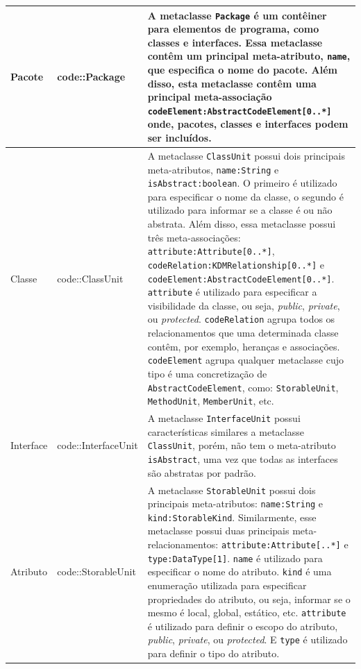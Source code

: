 \begin{longtable}[c]{| m{1.9cm} | m{3.57cm}| m{9.3cm} |}
 Pacote & code::Package & A metaclasse \texttt{Package} é um contêiner para elementos de programa, como classes e interfaces. Essa metaclasse contêm um principal meta-atributo, \texttt{name}, que especifica o nome do pacote. Além disso, esta metaclasse contêm uma principal meta-associação \texttt{codeElement:AbstractCodeElement[0..*]} onde, pacotes, classes e interfaces podem ser incluídos. \\ 
\hline
Classe & code::ClassUnit & A metaclasse \texttt{ClassUnit} possui dois principais meta-atributos,  \texttt{name:String} e \texttt{isAbstract:boolean}. O primeiro é utilizado para especificar o nome da classe, o segundo é utilizado para informar se a classe é ou não abstrata. Além disso, essa metaclasse possui três meta-associações: \texttt{attribute:Attribute[0..*]}, \texttt{codeRelation:KDMRelationship[0..*]} e  \texttt{codeElement:AbstractCodeElement[0..*]}. \texttt{attribute} é utilizado para especificar a  visibilidade da classe, ou seja, \textit{public}, \textit{private}, ou \textit{protected}. \texttt{codeRelation} agrupa todos os relacionamentos que uma determinada classe contêm, por exemplo, heranças e associações. \texttt{codeElement} agrupa qualquer metaclasse cujo tipo é uma concretização de \texttt{AbstractCodeElement}, como: \texttt{StorableUnit}, \texttt{MethodUnit}, \texttt{MemberUnit}, etc. \\ 
\hline
Interface & code::InterfaceUnit & A metaclasse \texttt{InterfaceUnit} possui características similares a metaclasse \texttt{ClassUnit}, porém, não tem o meta-atributo \texttt{isAbstract}, uma vez que todas as interfaces são abstratas por padrão. \\ 
\hline
Atributo & code::StorableUnit & A metaclasse \texttt{StorableUnit} possui dois principais meta-atributos: \texttt{name:String} e \texttt{kind:StorableKind}. Similarmente, esse metaclasse possui duas principais meta-relacionamentos: \texttt{attribute:Attribute[..*]} e \texttt{type:DataType[1]}. \texttt{name} é utilizado para especificar o nome do atributo. \texttt{kind} é uma enumeração utilizada para especificar propriedades do atributo, ou seja, informar se o mesmo é local, global, estático, etc. \texttt{attribute} é utilizado para definir o escopo do atributo, \textit{public}, \textit{private}, ou \textit{protected}. E \texttt{type} é utilizado para definir o tipo do atributo.  \\ 
\hline

\end{longtable}
